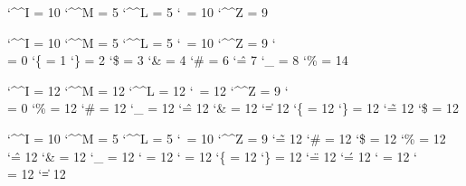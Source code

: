 

\ifx\nilcatcodes \undefined \newcatcodetable \nilcatcodes  \fi
\ifx\texcatcodes \undefined \newcatcodetable \texcatcodes  \fi
\ifx\luacatcodes \undefined \newcatcodetable \luacatcodes  \fi
\ifx\notcatcodes \undefined \newcatcodetable \notcatcodes  \fi
\ifx\vrbcatcodes \undefined \newcatcodetable \vrbcatcodes  \fi
\ifx\prtcatcodes \undefined \newcatcodetable \prtcatcodes  \fi

\startcatcodetable \nilcatcodes
    \catcode`\^^I = 10 %
    \catcode`\^^M =  5 %
    \catcode`\^^L =  5 %
    \catcode`\    = 10 %
    \catcode`\^^Z =  9 %
\stopcatcodetable

\startcatcodetable \texcatcodes
    \catcode`\^^I = 10
    \catcode`\^^M =  5
    \catcode`\^^L =  5
    \catcode`\    = 10
    \catcode`\^^Z =  9
    \catcode`\\   =  0
    \catcode`\{   =  1
    \catcode`\}   =  2
    \catcode`\$   =  3
    \catcode`\&   =  4
    \catcode`\#   =  6
    \catcode`\^   =  7
    \catcode`\_   =  8
    \catcode`\%   = 14
\stopcatcodetable

\startcatcodetable \luacatcodes
    \catcode`\^^I = 12 %
    \catcode`\^^M = 12 %
    \catcode`\^^L = 12 %
    \catcode`\    = 12 %
    \catcode`\^^Z =  9 %
    \catcode`\\   =  0
    \catcode`\%   = 12
    \catcode`\#   = 12
    \catcode`\_   = 12
    \catcode`\^   = 12
    \catcode`\&   = 12
    \catcode`\|   = 12
    \catcode`\{   = 12
    \catcode`\}   = 12
    \catcode`\~   = 12
    \catcode`\$   = 12
\stopcatcodetable

\startcatcodetable \notcatcodes
    \catcode`\^^I = 10 %
    \catcode`\^^M =  5 %
    \catcode`\^^L =  5 %
    \catcode`\    = 10 %
    \catcode`\^^Z =  9 %
    \catcode`\~   = 12
    \catcode`\#   = 12 %
    \catcode`\$   = 12 %
    \catcode`\%   = 12
    \catcode`\^   = 12
    \catcode`\&   = 12
    \catcode`\_   = 12
    \catcode`\<   = 12
    \catcode`\>   = 12
    \catcode`\{   = 12
    \catcode`\}   = 12
    \catcode`\"   = 12
    \catcode`\'   = 12
    \catcode`\/   = 12
    \catcode`\\   = 12
    \catcode`\|   = 12
\stopcatcodetable

